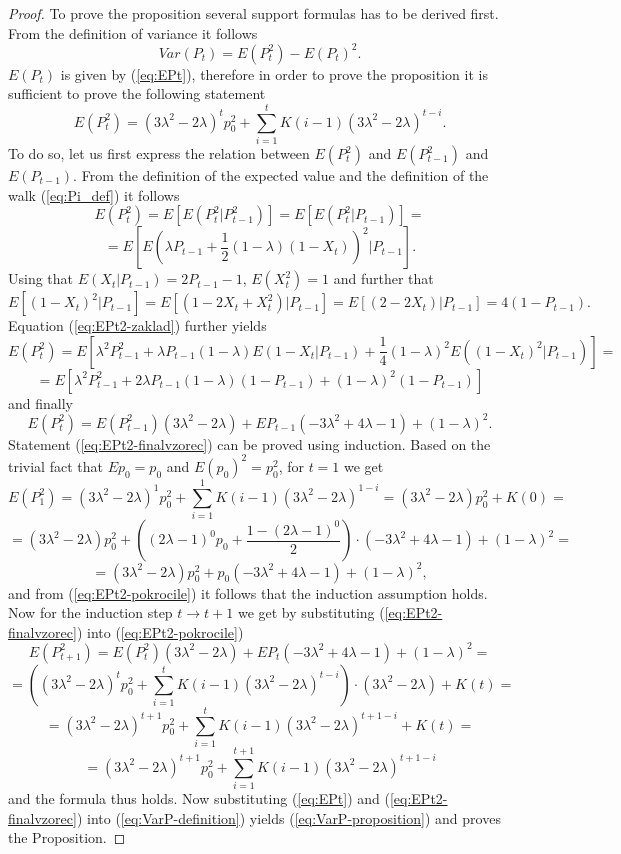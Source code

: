\documentclass{amsart}
\theoremstyle{definition}
\theoremstyle{plain}
\theoremstyle{plain}
\numberwithin{equation}{section}
\begin{document}
\begin{proof}
To prove the proposition several support formulas has to be derived
first. From the definition of variance it follows 
\begin{equation}
Var(P_{t})=E(P_{t}^{2})-E(P_{t})^{2}.\label{eq:VarP-definition}
\end{equation}
$E(P_{t})$ is given by (\ref{eq:EPt}), therefore in order to prove
the proposition it is sufficient to prove the following statement
\begin{equation}
E(P_{t}^{2})=(3\lambda^{2}-2\lambda)^{t}p_{0}^{2}+\sum_{i=1}^{t}K(i-1)(3\lambda^{2}-2\lambda)^{t-i}.\label{eq:EPt2-finalvzorec}
\end{equation}
To do so, let us first express the relation between $E(P_{t}^{2})$
and $E(P_{t-1}^{2})$ and $E(P_{t-1}).$ From the definition of the
expected value and the definition of the walk (\ref{eq:Pi_def}) it follows
\[
E(P_{t}^{2})=E[E(P_{t}^{2}|P_{t-1}^{2})]=E[E(P_{t}^{2}|P_{t-1})]=
\]
\begin{equation}
=E[E(\lambda P_{t-1}+\frac{1}{2}(1-\lambda)(1-X_{t}))^{2}|P_{t-1}].\label{eq:EPt2-zaklad}
\end{equation}
Using that $E(X_{t}|P_{t-1})=2P_{t-1}-1$, $E(X_{t}^{2})=1$ and further
that 
\[
E[(1-X_{t})^{2}|P_{t-1}]=E[(1-2X_{t}+X_{t}^{2})|P_{t-1}]
=E[(2-2X_{t})|P_{t-1}]= 4(1-P_{t-1}).
\]
Equation (\ref{eq:EPt2-zaklad}) further yields
\[
E(P_{t}^{2})=E[\lambda^{2}P_{t-1}^{2}+\lambda P_{t-1}(1-\lambda)E(1-X_{t}|P_{t-1})+\frac{1}{4}(1-\lambda)^{2}E((1-X_{t})^{2}|P_{t-1})]=
\]
\[
=E[\lambda^{2}P_{t-1}^{2}+2\lambda P_{t-1}(1-\lambda)(1-P_{t-1})+(1-\lambda)^{2}(1-P_{t-1})]
\]
 and finally
\begin{equation}
E(P_{t}^{2})=E(P_{t-1}^{2})(3\lambda^{2}-2\lambda)+EP_{t-1}(-3\lambda^{2}+4\lambda-1)+(1-\lambda)^{2}.\label{eq:EPt2-pokrocile}
\end{equation}
Statement (\ref{eq:EPt2-finalvzorec}) can be proved using induction.
Based on the trivial fact that $Ep_{0}=p_{0}$ and $E(p_{0})^{2}=p_{0}^{2}$,
for $t=1$ we get
\[
E(P_{1}^{2})=(3\lambda^{2}-2\lambda)^{1}p_{0}^{2}+\sum_{i=1}^{1}K(i-1)(3\lambda^{2}-2\lambda)^{1-i}=(3\lambda^{2}-2\lambda)p_{0}^{2}+K(0)=
\]
\[
=(3\lambda^{2}-2\lambda)p_{0}^{2}+((2\lambda-1)^{0}p_{0}+\frac{1-(2\lambda-1)^{0}}{2})\cdot(-3\lambda^{2}+4\lambda-1)+(1-\lambda)^{2}=
\]
\[
=(3\lambda^{2}-2\lambda)p_{0}^{2}+p_{0}(-3\lambda^{2}+4\lambda-1)+(1-\lambda)^{2},
\]
and from (\ref{eq:EPt2-pokrocile}) it follows that the induction assumption
holds. Now for the induction step $t\rightarrow t+1$ we get by substituting
(\ref{eq:EPt2-finalvzorec}) into (\ref{eq:EPt2-pokrocile})
\[
E(P_{t+1}^{2})=E(P_{t}^{2})(3\lambda^{2}-2\lambda)+EP_{t}(-3\lambda^{2}+4\lambda-1)+(1-\lambda)^{2}=
\]
\[
=((3\lambda^{2}-2\lambda)^{t}p_{0}^{2}+\sum_{i=1}^{t}K(i-1)(3\lambda^{2}-2\lambda)^{t-i})\cdot(3\lambda^{2}-2\lambda)+K(t)=
\]
\[
=(3\lambda^{2}-2\lambda)^{t+1}p_{0}^{2}+\sum_{i=1}^{t}K(i-1)(3\lambda^{2}-2\lambda)^{t+1-i}+K(t)=
\]
\[
=(3\lambda^{2}-2\lambda)^{t+1}p_{0}^{2}+\sum_{i=1}^{t+1}K(i-1)(3\lambda^{2}-2\lambda)^{t+1-i}
\]
and the formula thus holds. Now substituting (\ref{eq:EPt}) and (\ref{eq:EPt2-finalvzorec})
into (\ref{eq:VarP-definition}) yields (\ref{eq:VarP-proposition})
and proves the Proposition.
\end{proof}
\end{document}
